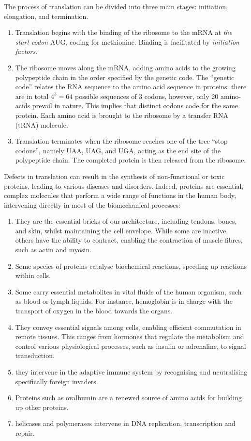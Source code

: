 The process of translation can be divided into three main stages: initiation, elongation, and termination.
\begin{enumerate}
    \item Translation begins with the binding of the ribosome to the mRNA at \textit{the start codon} AUG, coding for methionine. Binding is facilitated by \textit{initiation factors}.
    \item The ribosome moves along the mRNA, adding amino acids to the growing polypeptide chain in the order specified by the genetic code. The \enquote{genetic code} relates the RNA sequence to the amino acid sequence in proteins: there are in total $4^3=64$ possible sequences of 3 codons, however, only 20 amino-acids prevail in nature. This implies that distinct codons code for the same protein. Each amino acid is brought to the ribosome by a transfer RNA (tRNA) molecule.
    \item Translation terminates when the ribosome reaches one of the tree \enquote{stop codons}, namely UAA, UAG, and UGA, acting as the end site of the polypeptide chain. The completed protein is then released from the ribosome.
\end{enumerate}

Defects in translation can result in the synthesis of non-functional or toxic proteins, leading to various diseases and disorders. Indeed, proteins are essential, complex molecules that perform a wide range of functions in the human body, intervening directly in most of the biomechanical processes: 

\begin{enumerate}[label=(\alph*)]
\item[Structural support:] They are the essential bricks of our architecture, including tendons, bones, and skin, whilst maintaining the cell envelope. While some are inactive, others have the ability to contract, enabling the contraction of muscle fibres, such as actin and myosin.
\item[Enzymes:] Some species of proteins catalyse biochemical reactions, speeding up reactions within cells.
\item[Transport:] Some carry essential metabolites in vital fluids of the human organism, such as blood or lymph liquids. For instance, hemoglobin is in charge with the transport of oxygen in the blood towards the organs. 
\item[Cell signalling:] They convey essential signals among cells, enabling efficient commutation in remote tissues. This ranges from hormones that regulate the \gls{metabolism} and control various physiological processes, such as insulin or adrenaline, to signal \gls{transduction}.
\item[Antibodies:] they intervene in the adaptive immune system by recognising and neutralising specifically foreign invaders.
\item[Storage:] Proteins such as ovalbumin are a renewed source of amino acids for building up other proteins.
\item[DNA replication and repair:] helicases and polymerases intervene in DNA replication, transcription and repair.
\end{enumerate}

